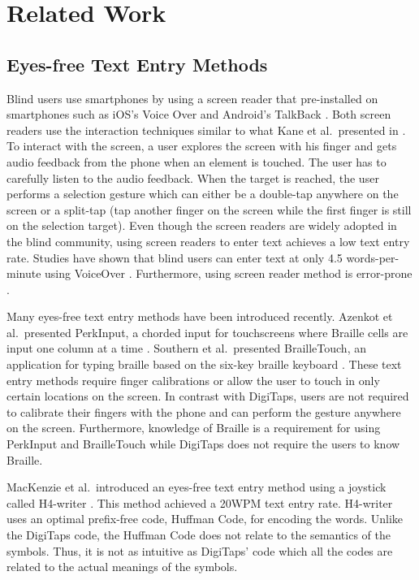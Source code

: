 \section{Related Work}
\label{sec:related}

\subsection{Eyes-free Text Entry Methods}
Blind users use smartphones by using a screen reader that pre-installed on smartphones such as iOS's Voice Over \cite{VoiceOver:2014} and Android's TalkBack \cite{TalkBack:2014}. Both screen readers use the interaction techniques similar to what Kane et al.\ presented in \cite{Kane:2008}. To interact with the screen, a user explores the screen with his finger and gets audio feedback from the phone when an element is touched. The user has to carefully listen to the audio feedback. When the target is reached, the user performs a selection gesture which can either be a double-tap anywhere on the screen or a split-tap (tap another finger on the screen while the first finger is still on the selection target). Even though the screen readers are widely adopted in the blind community, using screen readers to enter text achieves a low text entry rate. Studies have shown that blind users can enter text at only 4.5 words-per-minute using VoiceOver \cite{Azenkot:2012}. Furthermore, using screen reader method is error-prone \cite{Oliveira:2011}.

Many eyes-free text entry methods have been introduced recently. Azenkot et al.\ presented PerkInput, a chorded input for touchscreens where Braille cells are input one column at a time \cite{Azenkot:2012}. Southern et al.\ presented BrailleTouch, an application for typing braille based on the six-key braille keyboard \cite{Southern:2012}. These text entry methods require finger calibrations or allow the user to touch in only certain locations on the screen. In contrast with DigiTaps, users are not required to calibrate their fingers with the phone and can perform the gesture anywhere on the screen. Furthermore, knowledge of Braille is a requirement for using PerkInput and BrailleTouch while DigiTaps does not require the users to know Braille.

MacKenzie et al.\ introduced an eyes-free text entry method using a joystick called H4-writer \cite{MacKenzie:2011}. This method achieved a 20WPM text entry rate. H4-writer uses an optimal prefix-free code, Huffman Code, for encoding the words. Unlike the DigiTaps code, the Huffman Code does not relate to the semantics of the symbols. Thus, it is not as intuitive as DigiTaps' code which all the codes are related to the actual meanings of the symbols.

